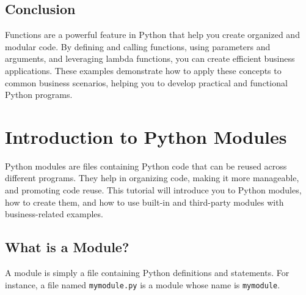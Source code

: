 \documentclass[
  letterpaper,
  DIV=11,
  numbers=noendperiod]{scrreprt}
\newenvironment{Shaded}{\begin{snugshade}}{\end{snugshade}}
\newcommand{\BuiltInTok}[1]{\textcolor[rgb]{0.00,0.23,0.31}{#1}}
\newcommand{\CommentTok}[1]{\textcolor[rgb]{0.37,0.37,0.37}{#1}}
\newcommand{\DecValTok}[1]{\textcolor[rgb]{0.68,0.00,0.00}{#1}}
\newcommand{\FloatTok}[1]{\textcolor[rgb]{0.68,0.00,0.00}{#1}}
\newcommand{\KeywordTok}[1]{\textcolor[rgb]{0.00,0.23,0.31}{\textbf{#1}}}
\newcommand{\NormalTok}[1]{\textcolor[rgb]{0.00,0.23,0.31}{#1}}
\newcommand{\OperatorTok}[1]{\textcolor[rgb]{0.37,0.37,0.37}{#1}}
\newcommand{\SpecialCharTok}[1]{\textcolor[rgb]{0.37,0.37,0.37}{#1}}
\newcommand{\SpecialStringTok}[1]{\textcolor[rgb]{0.13,0.47,0.30}{#1}}
\begin{document}
\begin{Shaded}
\end{Shaded}

\subsection{Conclusion}\label{conclusion-4}

Functions are a powerful feature in Python that help you create
organized and modular code. By defining and calling functions, using
parameters and arguments, and leveraging lambda functions, you can
create efficient business applications. These examples demonstrate how
to apply these concepts to common business scenarios, helping you to
develop practical and functional Python programs.

\section{Introduction to Python
Modules}\label{introduction-to-python-modules}

Python modules are files containing Python code that can be reused
across different programs. They help in organizing code, making it more
manageable, and promoting code reuse. This tutorial will introduce you
to Python modules, how to create them, and how to use built-in and
third-party modules with business-related examples.

\subsection{What is a Module?}\label{what-is-a-module}

A module is simply a file containing Python definitions and statements.
For instance, a file named \texttt{mymodule.py} is a module whose name
is \texttt{mymodule}.
\end{document}
